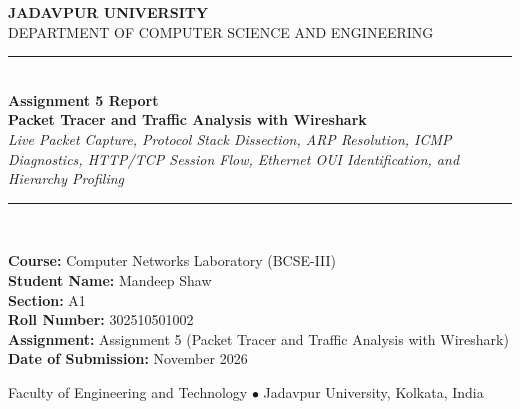 \documentclass[11pt,a4paper]{article}
\begin{document}
\hypersetup{pageanchor=false}
\begin{titlepage}
  \centering
  \vspace*{1.2cm}
  {\Large \textbf{JADAVPUR UNIVERSITY}}\\[0.3cm]
  {\large DEPARTMENT OF COMPUTER SCIENCE AND ENGINEERING}\\[1.8cm]

  \rule{\linewidth}{1.2pt}\\[0.4cm]
  {\huge \textbf{Assignment 5 Report}}\\[0.3cm]
  {\LARGE \textbf{Packet Tracer and Traffic Analysis with Wireshark}}\\[0.3cm]
  {\large \textit{Live Packet Capture, Protocol Stack Dissection, ARP Resolution, ICMP Diagnostics, HTTP/TCP Session Flow, Ethernet OUI Identification, and Hierarchy Profiling}}\\[0.3cm]
  \rule{\linewidth}{1.2pt}\\[1.8cm]

  \begin{minipage}[t]{0.88\textwidth}
    \large
    \textbf{Course:} Computer Networks Laboratory (BCSE-III)\\[0.25cm]
    \textbf{Student Name:} Mandeep Shaw\\[0.25cm]
    \textbf{Section:} A1\\[0.25cm]
    \textbf{Roll Number:} 302510501002\\[0.25cm]
    \textbf{Assignment:} Assignment 5 (Packet Tracer and Traffic Analysis with Wireshark)\\[0.25cm]
    \textbf{Date of Submission:} November 2026
  \end{minipage}

  \vfill
  {\small Faculty of Engineering and Technology $\bullet$ Jadavpur University, Kolkata, India}
  \vspace*{0.8cm}
\end{titlepage}

\hypersetup{pageanchor=true}
\tableofcontents
\newpage
{}
\setcounter{page}{1}

\end{document}
